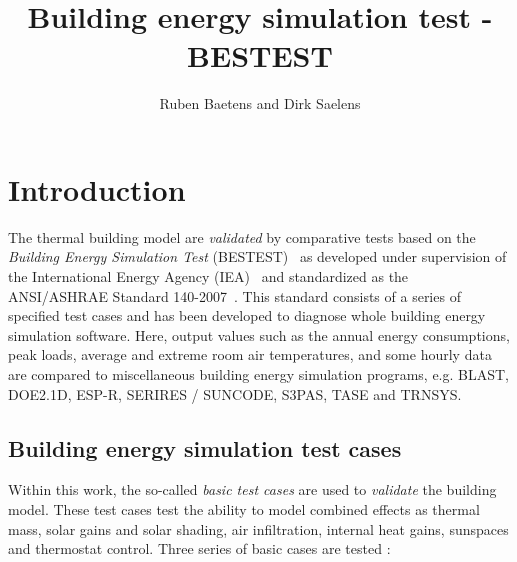 \title{Building energy simulation test - BESTEST}
\author{Ruben Baetens and Dirk Saelens}
\maketitle

\section{Introduction}

The thermal building model are \emph{validated} by comparative tests based on the \emph{Building Energy Simulation Test} (BESTEST)~\cite{Judkoff1995, Neymark2008} as developed under supervision of the International Energy Agency (IEA)~\cite{Lomas1994,Lomas1994a} and standardized as the ANSI/ASHRAE Standard 140-2007~\cite{ASHRAE140}. This standard consists of a series of specified test cases and has been developed to diagnose whole building energy simulation software. Here, output values such as the annual energy consumptions, peak loads, average and extreme room air temperatures, and some hourly data are compared to miscellaneous building energy simulation programs, e.g. BLAST, DOE2.1D, ESP-R, SERIRES / SUNCODE, S3PAS, TASE and TRNSYS. 

\subsection{Building energy simulation test cases}

Within this work, the so-called \emph{basic test cases} are used to \emph{validate} the building model. These test cases test the ability to model combined effects as thermal mass, solar gains and solar shading, air infiltration, internal heat gains, sunspaces and thermostat control. Three series of basic cases are tested :

